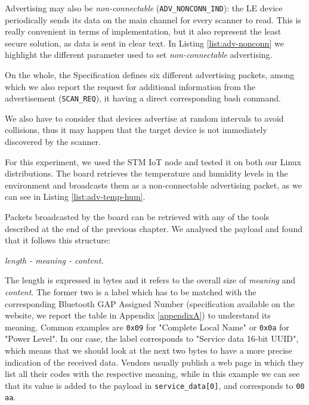 Advertising may also be \textit{non-connectable} (\texttt{ADV\_NONCONN\_IND}): the LE device periodically sends its data on the main channel for every scanner to read. This is really convenient in terms of implementation, but it also represent the least secure solution, as data is sent in clear text. In Listing \ref{list:adv-nonconn} we highlight the different parameter used to set \textit{non-connectable} advertising.


On the whole, the Specification defines six different advertising packets, among which we also report the request for additional information from the advertisement (\texttt{SCAN\_REQ}), it having a direct corresponding bash command.

We also have to consider that devices advertise at random intervals to avoid collisions, thus it may happen that the target device is not immediately discovered by the scanner.

For this experiment, we used the STM IoT node and tested it on both our Linux distributions. The board retrieves the temperature and humidity levels in the environment and broadcasts them as a non-connectable advertising packet, as we can see in Listing \ref{list:adv-temp-hum}.


Packets broadcasted by the board can be retrieved with any of the tools described at the end of the previous chapter. We analysed the payload and found that it follows this structure:
\begin{center}
	\textit{length - meaning - content}.
\end{center}
The length is expressed in bytes and it refers to the overall size of \textit{meaning} and \textit{content}. The former two is a label which has to be matched with the corresponding Bluetooth GAP Assigned Number (specification available on the website, we report the table in Appendix \ref{appendixA}) to understand its meaning. Common examples are \texttt{0x09} for "Complete Local Name" or \texttt{0x0a} for "Power Level". In our case, the label corresponds to "Service data 16-bit UUID", which means that we should look at the next two bytes to have a more precise indication of the received data. Vendors usually publish a web page in which they list all their codes with the respective meaning, while in this example we can see that its value is added to the payload in \texttt{service\_data[0]}, and corresponds to \texttt{00 aa}.

